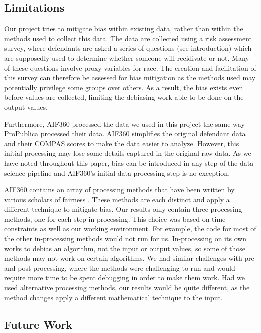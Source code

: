 \documentclass[water,article,submit,moreauthors,pdftex]{mdpi}
\begin{document}
\hypertarget{limitations}{%
\subsection{Limitations}\label{limitations}}

Our project tries to mitigate bias within existing data, rather than
within the methods used to collect this data. The data are collected
using a risk assessment survey, where defendants are asked a series of
questions (see introduction) which are supposedly used to determine
whether someone will recidivate or not. Many of these questions involve
proxy variables for race. The creation and facilitation of this survey
can therefore be assessed for bias mitigation as the methods used may
potentially privilege some groups over others. As a result, the bias
exists even before values are collected, limiting the debiasing work
able to be done on the output values.

Furthermore, AIF360 processed the data we used in this project the same
way ProPublica processed their data. AIF360 simplifies the original
defendant data and their COMPAS scores to make the data easier to
analyze. However, this initial processing may lose some details captured
in the original raw data. As we have noted throughout this paper, bias
can be introduced in any step of the data science pipeline and AIF360's
initial data processing step is no exception.

AIF360 contains an array of processing methods that have been written by
various scholars of fairness \citep{aif360-oct-2018}. These methods are
each distinct and apply a different technique to mitigate bias. Our
results only contain three processing methods, one for each step in
processing. This choice was based on time constraints as well as our
working environment. For example, the code for most of the other
in-processing methods would not run for us. In-processing on its own
works to debias an algorithm, not the input or output values, so some of
those methods may not work on certain algorithms. We had similar
challenges with pre and post-processing, where the methods were
challenging to run and would require more time to be spent debugging in
order to make them work. Had we used alternative processing methods, our
results would be quite different, as the method changes apply a
different mathematical technique to the input.

\hypertarget{future-work}{%
\subsection{Future Work}\label{future-work}}
\end{document}
